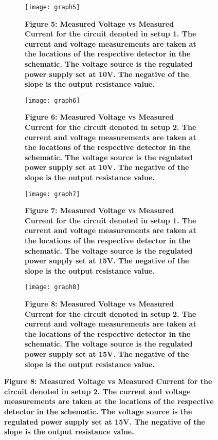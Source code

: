 \begin{figure}[H]
    \centering
    \begin{subfigure}{0.45\textwidth}
		\texttt{[image: graph5]}
		\caption{\textbf{Figure 5: Measured Voltage vs Measured Current for the circuit denoted in setup 1. The current and voltage measurements are taken at the locations of the respective detector in the schematic. The voltage source is the regulated power supply set at 10V. The negative of the slope is the output resistance value.}}
	\end{subfigure}
    \hspace{0.08\textwidth}
	\begin{subfigure}{0.45\textwidth}
		\texttt{[image: graph6]}
		\caption{\textbf{Figure 6: Measured Voltage vs Measured Current for the circuit denoted in setup 2. The current and voltage measurements are taken at the locations of the respective detector in the schematic. The voltage source is the regulated power supply set at 10V. The negative of the slope is the output resistance value.}}
	\end{subfigure}
    \begin{subfigure}{0.45\textwidth}
		\texttt{[image: graph7]}
		\caption{\textbf{Figure 7: Measured Voltage vs Measured Current for the circuit denoted in setup 1. The current and voltage measurements are taken at the locations of the respective detector in the schematic. The voltage source is the regulated power supply set at 15V. The negative of the slope is the output resistance value.}}
	\end{subfigure}
    \hspace{0.08\textwidth}
	\begin{subfigure}{0.45\textwidth}
		\texttt{[image: graph8]}
		\caption{\textbf{Figure 8: Measured Voltage vs Measured Current for the circuit denoted in setup 2. The current and voltage measurements are taken at the locations of the respective detector in the schematic. The voltage source is the regulated power supply set at 15V. The negative of the slope is the output resistance value.}}
	\end{subfigure}
\end{figure}

